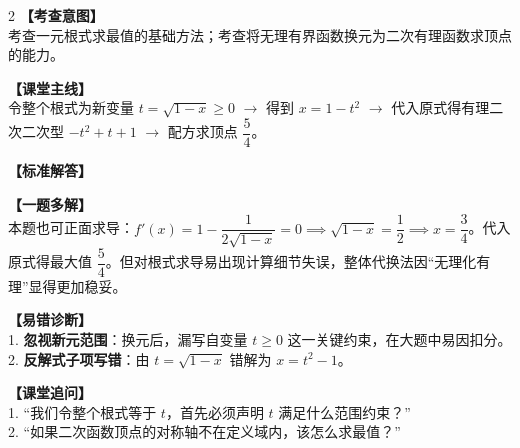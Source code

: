 \documentclass[12pt,a4paper]{ctexart}
\begin{document}
\begin{paracol}{2}
  \textbf{【考查意图】}\\
  考查一元根式求最值的基础方法；考查将无理有界函数换元为二次有理函数求顶点的能力。
  
  \textbf{【课堂主线】}\\
  令整个根式为新变量 \(t = \sqrt{1-x} \geqslant 0\) \(\to\) 得到 \(x = 1-t^2\) \(\to\) 代入原式得有理二次二次型 \(-t^2+t+1\) \(\to\) 配方求顶点 \(\dfrac{5}{4}\)。
  
  \textbf{【标准解答】}\\
  \qOneSolution
  
  \textbf{【一题多解】}\\
  本题也可正面求导：\(f'(x) = 1 - \dfrac{1}{2\sqrt{1-x}} = 0 \implies \sqrt{1-x} = \dfrac{1}{2} \implies x = \dfrac{3}{4}\)。代入原式得最大值 \(\dfrac{5}{4}\)。但对根式求导易出现计算细节失误，整体代换法因“无理化有理”显得更加稳妥。

  \switchcolumn
  \textbf{【易错诊断】}\\
  1. \textbf{忽视新元范围}：换元后，漏写自变量 \(t \geqslant 0\) 这一关键约束，在大题中易因扣分。\\
  2. \textbf{反解式子项写错}：由 \(t=\sqrt{1-x}\) 错解为 \(x=t^2-1\)。
  
  \textbf{【课堂追问】}\\
  1. “我们令整个根式等于 \(t\)，首先必须声明 \(t\) 满足什么范围约束？”\\
  2. “如果二次函数顶点的对称轴不在定义域内，该怎么求最值？”
\end{paracol}

\vspace{0.8em}
\par{}
\vspace{0.8em}

\qTwoStem
\qTwoOptions
\end{document}

